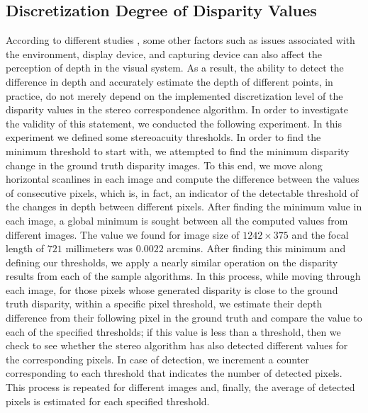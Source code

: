 \subsection{Discretization Degree of Disparity Values}
According to different studies \cite{dras96, kru10,azuma01}, some other factors such as issues associated with the environment, display device, and capturing device
can also affect the perception of depth in the visual system. As a result, the ability to detect the difference in depth and accurately estimate the
depth of different points, in practice,
do not merely depend on the implemented discretization level of the disparity values in the stereo correspondence algorithm.
In order to investigate the validity of this statement, we conducted the following experiment. In this experiment we defined some stereoacuity thresholds. 
In order to find the minimum threshold to start with, we attempted to find the 
minimum disparity change in the ground truth disparity images. To this end, we move along horizontal scanlines in each image and 
compute the difference between the values of consecutive pixels, which is, in fact, an indicator of the detectable threshold of the changes in depth between
different pixels. 
After finding the minimum value in each image, a global minimum is sought between all the computed values from different images.
The value we found for image size of $1242\times375$ and the focal length of $721$ millimeters was $0.0022$ arcmins.
After finding this minimum and defining our thresholds, we apply a nearly similar operation on the disparity results from each of the sample algorithms.
In this process, while moving through each image, for those pixels whose generated disparity is close to the ground truth disparity, within a specific pixel threshold, 
we estimate their depth difference from their following pixel
in the ground truth and compare the value to each of the specified thresholds; if this value is less than a threshold, then we check to see whether
the stereo algorithm has also detected different values for the corresponding pixels. 
In case of detection, we increment a counter corresponding to each threshold that indicates the number of detected pixels.
This process is repeated for different images and, finally, the average of detected pixels is estimated for each specified threshold.

